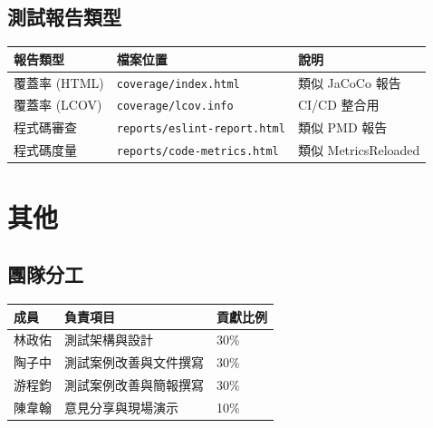 \documentclass[11pt, a4paper]{article}
\begin{document}
\subsection{測試報告類型}

\begin{center}
  \renewcommand{\arraystretch}{1.4}
  \begin{tabular}{p{} p{} p{}}
    \toprule
    \textbf{報告類型}                   & \textbf{檔案位置}                       & \textbf{說明}        \\
    \midrule
    覆蓋率 (HTML)                      & \texttt{coverage/index.html}        & 類似 JaCoCo 報告       \\
    \rowcolor{LightGray} 覆蓋率 (LCOV) & \texttt{coverage/lcov.info}         & CI/CD 整合用          \\
    程式碼審查                           & \texttt{reports/eslint-report.html} & 類似 PMD 報告          \\
    \rowcolor{LightGray} 程式碼度量      & \texttt{reports/code-metrics.html}  & 類似 MetricsReloaded \\
    \bottomrule
  \end{tabular}
\end{center}

\section{其他}

\subsection{團隊分工}

\begin{center}
  \renewcommand{\arraystretch}{1.4}
  \begin{tabular}{p{} p{} p{}}
    \toprule
    \textbf{成員}              & \textbf{負責項目} & \textbf{貢獻比例} \\
    \midrule
    林政佑                      & 測試架構與設計       & 30\%          \\
    \rowcolor{LightGray} 陶子中 & 測試案例改善與文件撰寫   & 30\%          \\
    游程鈞                      & 測試案例改善與簡報撰寫   & 30\%          \\
    \rowcolor{LightGray} 陳韋翰 & 意見分享與現場演示     & 10\%          \\
    \bottomrule
  \end{tabular}
\end{center}
\end{document}

